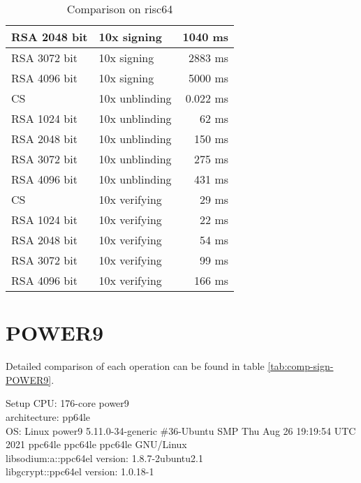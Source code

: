 \begin{table}[ht]
\begin{tabular}{llr}
        RSA 2048 bit & 10x signing & 1040 ms \\\hline
        RSA 3072 bit & 10x signing & 2883 ms \\\hline
        RSA 4096 bit & 10x signing & 5000 ms \\\hline
        \hline
        CS & 10x unblinding & 0.022 ms \\\hline
        RSA 1024 bit & 10x unblinding & 62 ms \\\hline
        RSA 2048 bit & 10x unblinding & 150 ms \\\hline
        RSA 3072 bit & 10x unblinding & 275 ms \\\hline
        RSA 4096 bit & 10x unblinding & 431 ms \\\hline
        \hline
        CS & 10x verifying & 29 ms \\\hline
        RSA 1024 bit & 10x verifying & 22 ms \\\hline
        RSA 2048 bit & 10x verifying & 54 ms \\\hline
        RSA 3072 bit & 10x verifying & 99 ms \\\hline
        RSA 4096 bit & 10x verifying & 166 ms \\\hline
    \end{tabular}
    \caption{Comparison on risc64}
    \label{tab:comp-sign-risc64}
\end{table}

\section{POWER9}
Detailed comparison of each operation can be found in table \ref{tab:comp-sign-POWER9}.
\begin{bfhBox}{Setup}
	CPU:  176-core power9\\
    architecture: pp64le \\
    OS: Linux power9 5.11.0-34-generic \#36-Ubuntu SMP Thu Aug 26 19:19:54 UTC 2021 ppc64le ppc64le ppc64le GNU/Linux \\
    libsodium:a::ppc64el version: 1.8.7-2ubuntu2.1  \\ 
    libgcrypt::ppc64el version: 1.0.18-1
\end{bfhBox}

